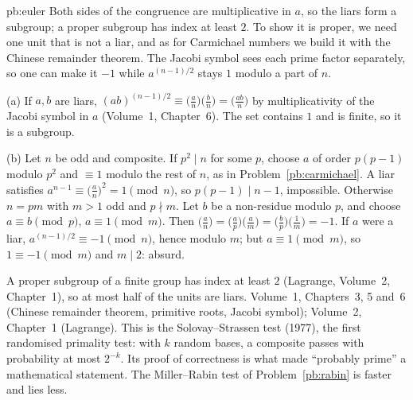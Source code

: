 \begin{solution}{pb:euler}
\idea Both sides of the congruence are multiplicative in $a$, so the liars form a subgroup; a proper subgroup has index at
least $2$. To show it is proper, we need one unit that is not a liar, and as for Carmichael numbers we build it with the
Chinese remainder theorem. The Jacobi symbol sees each prime factor separately, so one can make it $-1$ while $a^{(n-1)/2}$
stays $1$ modulo a part of $n$.

\writeup (a) If $a,b$ are liars, $(ab)^{(n-1)/2}\equiv\bigl(\frac an\bigr)\bigl(\frac bn\bigr)=\bigl(\frac{ab}n\bigr)$ by
multiplicativity of the Jacobi symbol in $a$ (Volume~1, Chapter~6). The set contains $1$ and is finite, so it is a subgroup.

(b) Let $n$ be odd and composite. If $p^2\mid n$ for some $p$, choose $a$ of order $p(p-1)$ modulo $p^2$ and $\equiv1$ modulo the rest
of $n$, as in Problem~\ref{pb:carmichael}. A liar satisfies $a^{n-1}\equiv\bigl(\frac an\bigr)^2=1\pmod n$, so $p(p-1)\mid n-1$,
impossible. Otherwise $n=pm$ with $m>1$ odd and $p\nmid m$. Let $b$ be a non-residue modulo $p$, and choose $a\equiv b\pmod p$,
$a\equiv1\pmod m$. Then $\bigl(\frac an\bigr)=\bigl(\frac ap\bigr)\bigl(\frac am\bigr)=\bigl(\frac bp\bigr)\bigl(\frac1m\bigr)=-1$. If $a$
were a liar, $a^{(n-1)/2}\equiv-1\pmod n$, hence modulo $m$; but $a\equiv1\pmod m$, so $1\equiv-1\pmod m$ and $m\mid2$: absurd.

A proper subgroup of a finite group has index at least $2$ (Lagrange, Volume~2, Chapter~1), so at most half of the units are
liars.
\tools Volume~1, Chapters~3, 5 and~6 (Chinese remainder theorem, primitive roots, Jacobi symbol); Volume~2, Chapter~1 (Lagrange).
\leads This is the Solovay--Strassen test (1977), the first randomised primality test: with $k$ random bases, a composite
passes with probability at most $2^{-k}$. Its proof of correctness is what made ``probably prime'' a mathematical statement.
The Miller--Rabin test of Problem~\ref{pb:rabin} is faster and lies less.
\end{solution}

